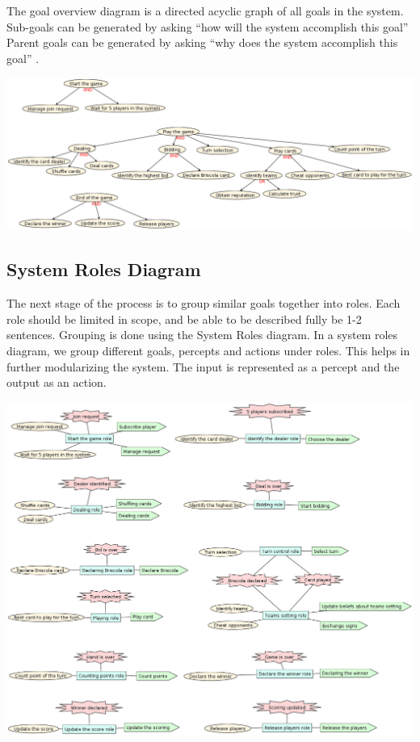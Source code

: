 \documentclass[a4paper]{article}
\begin{document}
The goal overview diagram is a directed acyclic graph of all goals in the system. Sub-goals can be generated by asking ``how will the system accomplish this goal'' Parent goals can be generated by asking ``why does the system accomplish this goal'' .

  \includegraphics[keepaspectratio,scale=0.3]{pdt/images/system_specification/goal_overview.png}

\subsection{System Roles Diagram}
The next stage of the process is to group similar goals together into roles. Each role should be limited in scope, and be able to be described fully be 1-2 sentences. Grouping is done using the System Roles diagram. In a system roles diagram, we group different goals, percepts and actions under roles. This helps in further modularizing the system. The input is represented as a percept and the output as an action.

\includegraphics[keepaspectratio,scale=0.3]{pdt/images/system_specification/system_roles.png}
\end{document}
